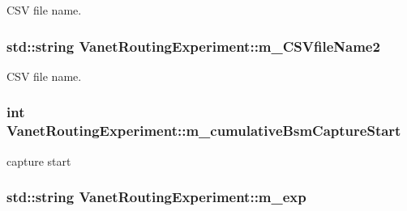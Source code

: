 C\+SV file name. 

\subsubsection[{\texorpdfstring{m\+\_\+\+C\+S\+Vfile\+Name2}{m_CSVfileName2}}]{\setlength{\rightskip}{0pt plus 5cm}std\+::string Vanet\+Routing\+Experiment\+::m\+\_\+\+C\+S\+Vfile\+Name2\hspace{0.3cm}{\ttfamily [private]}}\hypertarget{classVanetRoutingExperiment_a8ad342a946c50fa946eeb20fddfd2adc}{}\label{classVanetRoutingExperiment_a8ad342a946c50fa946eeb20fddfd2adc}


C\+SV file name. 

\subsubsection[{\texorpdfstring{m\+\_\+cumulative\+Bsm\+Capture\+Start}{m_cumulativeBsmCaptureStart}}]{\setlength{\rightskip}{0pt plus 5cm}int Vanet\+Routing\+Experiment\+::m\+\_\+cumulative\+Bsm\+Capture\+Start\hspace{0.3cm}{\ttfamily [private]}}\hypertarget{classVanetRoutingExperiment_a6bb964b8c0224a5651c6fbd8c93109e8}{}\label{classVanetRoutingExperiment_a6bb964b8c0224a5651c6fbd8c93109e8}


capture start 

\subsubsection[{\texorpdfstring{m\+\_\+exp}{m_exp}}]{\setlength{\rightskip}{0pt plus 5cm}std\+::string Vanet\+Routing\+Experiment\+::m\+\_\+exp\hspace{0.3cm}{\ttfamily [private]}}\hypertarget{classVanetRoutingExperiment_aead1047ca417585765814ed61fb15fb3}{}\label{classVanetRoutingExperiment_aead1047ca417585765814ed61fb15fb3}


